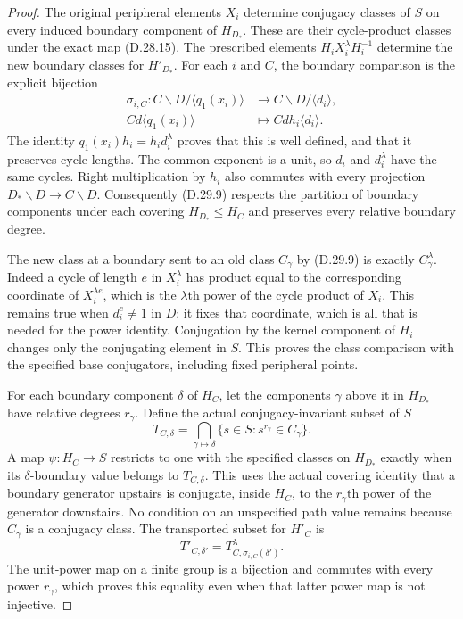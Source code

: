 \begin{proof}
The original peripheral elements $X_i$ determine
conjugacy classes of $S$ on every induced boundary
component of $H_{D_*}$.  These are their cycle-product
classes under the exact map \textup{(D.28.15)}.
The prescribed elements
$H_iX_i^\lambda H_i^{-1}$ determine the new boundary
classes for $H'_{D_*}$.
For each $i$ and $C$, the boundary comparison is the
explicit bijection
\[
 \begin{split}
 \sigma_{i,C}:
 C\backslash D/\langle q_1(x_i)\rangle
       &\longrightarrow C\backslash D/\langle d_i\rangle,\\
       C d\langle q_1(x_i)\rangle
       &\longmapsto C d h_i\langle d_i\rangle.
 \end{split}
 \tag{D.29.9}
\]
The identity $q_1(x_i)h_i=h_i d_i^\lambda$
proves that this is well defined, and that it preserves
cycle lengths.  The common exponent is a unit, so
$d_i$ and $d_i^\lambda$ have the same cycles.
Right multiplication by $h_i$ also commutes with
every projection $D_*\backslash D\to C\backslash D$.
Consequently \textup{(D.29.9)} respects the partition
of boundary components under each covering
$H_{D_*}\leq H_C$ and preserves every relative
boundary degree.

The new class at a boundary sent to an old class
$C_\gamma$ by \textup{(D.29.9)} is exactly
$C_\gamma^\lambda$.  Indeed a cycle of length $e$
in $X_i^\lambda$ has product equal to the corresponding
coordinate of $X_i^{\lambda e}$, which is the
$\lambda$th power of the cycle product of $X_i$.
This remains true when $d_i^e\ne1$ in $D$: it fixes
that coordinate, which is all that is needed for the
power identity.  Conjugation by the kernel component
of $H_i$ changes only the conjugating element in $S$.
This proves the class comparison with the specified
base conjugators, including fixed peripheral points.

For each boundary component $\delta$ of $H_C$, let
the components $\gamma$ above it in $H_{D_*}$ have
relative degrees $r_\gamma$.  Define the actual
conjugacy-invariant subset of $S$
\[
 T_{C,\delta}=\bigcap_{\gamma\mapsto\delta}
          \{s\in S:s^{r_\gamma}\in C_\gamma\}.
 \tag{D.29.10}
\]
A map $\psi:H_C\to S$ restricts to one with the
specified classes on $H_{D_*}$ exactly when its
$\delta$-boundary value belongs to $T_{C,\delta}$.
This uses the actual covering identity that a
boundary generator upstairs is conjugate, inside
$H_C$, to the $r_\gamma$th power of the generator
downstairs.  No condition on an unspecified path
value remains because $C_\gamma$ is a conjugacy class.
The transported subset for $H'_C$ is
\[
       T'_{C,\delta'}=
       T_{C,\sigma_{i,C}(\delta')}^\lambda.
 \tag{D.29.11}
\]
The unit-power map on a finite group is a bijection
and commutes with every power $r_\gamma$, which
proves this equality even when that latter power
map is not injective.


\end{proof}
